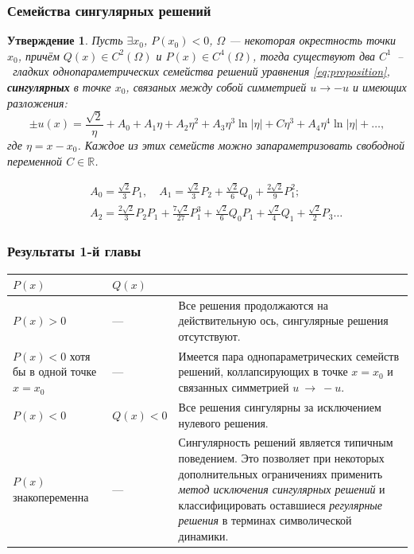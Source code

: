 \documentclass [10pt] {beamer}
\newtheorem{proposition}{Утверждение}
\begin{document}
\begin{frame}
	\frametitle{Семейства сингулярных решений}

	\begin{proposition}
		Пусть $\exists x_0$, $P(x_0) < 0$, $\Omega$ --- некоторая окрестность точки $x_0$, причём $Q(x) \in C^2(\Omega)$ и $P(x) \in C^4(\Omega)$, тогда существуют два $C^1$~--~гладких однопараметрических семейства решений уравнения \eqref{eq:proposition}, {\bf сингулярных} в точке $x_0$, связаных между собой симметрией $u \to -u$ и имеющих разложения:
		\begin{equation}
			\pm u(x) = \frac{\sqrt{2}} \eta + A_0 + A_1 \eta + A_2 \eta^2 + A_3 \eta^3 \ln|\eta| + C \eta^3 + A_4 	\eta^4 \ln|\eta| + \ldots,
			\label{eq:series}
		\end{equation}
 		где $\eta = x - x_0$.
		Каждое из этих семейств можно запараметризовать свободной переменной $C \in \mathbb{R}$.
	\end{proposition}

	\begin{small}
		\begin{eqnarray*}	
			&& A_0 = \frac{\sqrt{2}}3P_1, \quad A_1 = \frac{\sqrt{2}} 3P_2 + \frac{\sqrt{2}} 6Q_0 + \frac{2\sqrt{2}} 9P_1^2; \\[2mm]
			&& A_2 = \frac{2\sqrt{2}} 3P_2 P_1 + \frac{7\sqrt{2}}{27} P_1^3 + \frac{\sqrt{2}} 6Q_0 P_1 + \frac{\sqrt{2}} 4Q_1 + \frac{\sqrt{2}} 2P_3 \dots
		\end{eqnarray*}
	\end{small}	
\end{frame}

\begin{frame}
	\frametitle{Результаты 1-й главы}
	
	\begin{table}
		\begin{tabular}{ | m{70pt} | l || m{190pt} | }
			\hline
			$P(x)$ & $Q(x)$ & \\
			\hline
			$P(x) > 0$ & --- & Все решения продолжаются на действительную ось, сингулярные решения отсутствуют. \\
			\hline
			$P(x) < 0$ хотя бы в одной точке $x = x_0$ & --- & Имеется пара однопараметрических семейств решений, коллапсирующих в точке $x = x_0$ и связанных симметрией $u~\to~-u$. \\
			\hline
			$P(x) < 0$ & $Q(x) < 0$ & Все решения сингулярны за исключением нулевого решения. \\
			\hline
			$P(x)$ знакопеременна & --- & {\color{ceruleanblue} Сингулярность решений является типичным поведением}. Это позволяет при некоторых дополнительных ограничениях применить {\it метод исключения сингулярных решений} и {\color{ceruleanblue} классифицировать} оставшиеся {\it регулярные решения} в терминах символической динамики. \\
			\hline
		\end{tabular}
	\end{table}
\end{frame}
\end{document}
